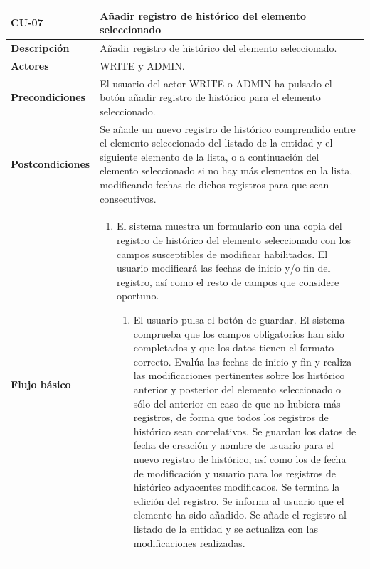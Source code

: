 \begin{table} [H]
    \centering
    \setlength{\leftmargini}{0.4cm}
	\resizebox{14cm}{!} { %
    \begin{tabular}{| m{3cm} | m{11cm} |}   
    \hline
	  \textbf{CU-07} & \textbf{Añadir registro de histórico del elemento seleccionado} \\\hline
	  \textbf{Descripción} & Añadir registro de histórico del elemento seleccionado. \\\hline
	  \textbf{Actores} & WRITE y ADMIN. \\\hline
	  \textbf{Precondiciones} & El usuario del actor WRITE o ADMIN ha pulsado el botón añadir registro de histórico para el elemento seleccionado. \\\hline
	  \textbf{Postcondiciones} & Se añade un nuevo registro de histórico  comprendido entre el elemento seleccionado del listado de la entidad y el siguiente elemento de la lista, o a continuación del elemento seleccionado si no hay más elementos en la lista, modificando fechas de dichos registros para que sean consecutivos. \\\hline
	  \textbf{Flujo básico} & 
		\begin{enumerate}
	  	\item El sistema muestra un formulario con una copia del registro de histórico del elemento seleccionado con los campos susceptibles de modificar habilitados. El usuario modificará las fechas de inicio y/o fin del registro, así como el resto de campos que considere oportuno. 
			\begin{enumerate}	
			   \item El usuario pulsa el botón de guardar. El sistema comprueba que los campos obligatorios han sido completados y que los datos tienen el formato correcto. Evalúa las fechas de inicio y fin y realiza las modificaciones pertinentes sobre los histórico anterior y posterior del elemento seleccionado o sólo del anterior en caso de que no hubiera más registros, de forma que todos los registros de histórico sean correlativos. Se guardan los datos de fecha de creación y nombre de usuario para el nuevo registro de histórico, así como los de fecha de modificación y usuario para los registros de histórico adyacentes modificados. Se termina la edición del registro. Se informa al usuario que el elemento ha sido añadido. Se añade el registro al listado de la entidad y se actualiza con las modificaciones realizadas.

\end{enumerate}
\end{enumerate}
\end{tabular}}
\end{table}
